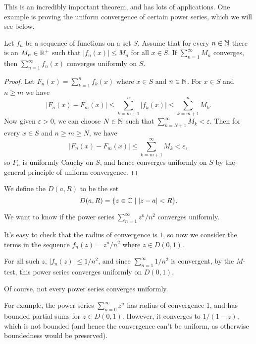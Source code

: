 \documentclass[a4paper]{scrartcl}
\begin{document}
This is an incredibly important theorem, and has lots of applications. One example is proving the uniform convergence of certain power series, which we will see below.

\begin{theorem}
    Let $f_n$ be a sequence of functions on a set $S$. Assume that for every $n \in \mathbb{N}$ there is an $M_n \in \mathbb{R}^+$ such that $|f_n(x)| \leq M_n$ for all $x \in S$. If $\sum_{n = 1}^{\infty} M_n$ converges, then $\sum_{n = 1}^{\infty} f_n(x)$ converges uniformly on $S$.
\end{theorem}
\begin{proof}
    Let $F_n(x) = \sum_{k = 1}^n f_k(x)$ where $x \in S$ and $n \in \mathbb{N}$.
    For $x \in S$ and $n \geq m$ we have
    $$
    |F_n(x) - F_m(x)| \leq \sum_{k = m + 1}^n |f_k(x)| \leq \sum_{k = m + 1}^n M_k.
    $$
    Now given $\varepsilon>0$, we can choose $N \in \mathbb{N}$ such that $\sum_{k = N + 1}^{\infty} M_k < \varepsilon$. Then for every $x \in S$ and $n \geq m \geq N$, we have
    $$
    |F_n(x) - F_m(x)| \leq \sum_{k = m + 1}^{\infty} M_k < \varepsilon,
    $$
    so $F_n$ is uniformly Cauchy on $S$, and hence converges uniformly on $S$ by the general principle of uniform convergence.
\end{proof}

\begin{definition}
    We define the  $D(a, R)$ to be the set 
    $$
    D(a, R) = \{ z \in \mathbb{C} \mid |z - a| < R \}.
    $$
\end{definition}

\begin{example}[Uniform Convergence of $\sum_{n = 1}^{\infty} z^n/n^2$]
    We want to know if the power series $\sum_{n = 1}^{\infty} z^n/n^2$ converges uniformly.

    It's easy to check that the radius of convergence is $1$, so now we consider the terms in the sequence $f_n(z) = z^n/n^2$ where $z \in D(0, 1)$.

    For all such $z$, $|f_n(z)| \leq 1/n^2$, and since $\sum_{n = 1}^{\infty} 1/n^2$ is convergent, by the $M$-test, this power series converges uniformly on $D(0, 1)$.
\end{example}

Of course, not every power series converges uniformly. 

For example, the power series $\sum_{n = 0}^{\infty} z^n$ has radius of convergence $1$, and has bounded partial sums for $z \in D(0, 1)$. However, it converges to $1/(1 - z)$, which is not bounded (and hence the convergence can't be uniform, as otherwise boundedness would be preserved).
\end{document}
